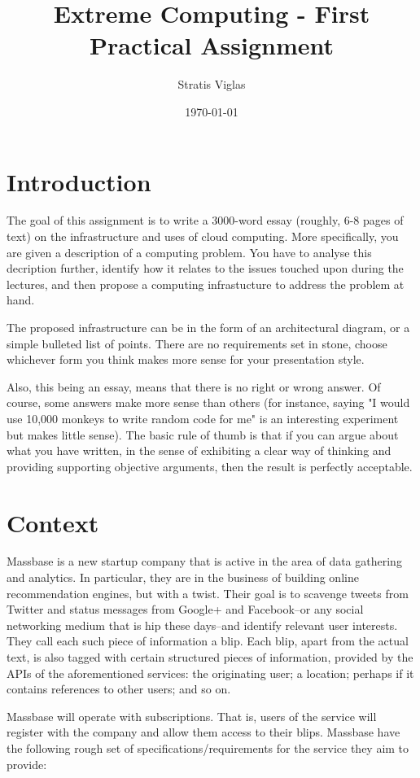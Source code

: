 \documentclass[12pt,twoside,a4paper]{article}
\title{Extreme Computing - First Practical Assignment}
\author{Stratis Viglas}
\date{\today}
\begin{document}
\maketitle
\section{Introduction}
The goal of this assignment is to write a 3000-word essay (roughly, 6-8 pages of text) on the infrastructure and uses of cloud computing. More specifically, you are given a description of a computing problem. You have to analyse this decription further, identify how it relates to the issues touched upon during the lectures, and then propose a computing infrastucture to address the problem at hand.

The proposed infrastructure can be in the form of an architectural diagram, or a simple bulleted list of points. There are no requirements set in stone, choose whichever form you think makes more sense for your presentation style.

Also, this being an essay, means that there is no right or wrong answer. Of course, some answers make more sense than others (for instance, saying "I would use 10,000 monkeys to write random code for me" is an interesting experiment but makes little sense). The basic rule of thumb is that if you can argue about what you have written, in the sense of exhibiting a clear way of thinking and providing supporting objective arguments, then the result is perfectly acceptable.
\section{Context}

Massbase is a new startup company that is active in the area of data gathering and analytics. In particular, they are in the business of building online recommendation engines, but with a twist. Their goal is to scavenge tweets from Twitter and status messages from Google+ and Facebook--or any social networking medium that is hip these days--and identify relevant user interests. They call each such piece of information a blip. Each blip, apart from the actual text, is also tagged with certain structured pieces of information, provided by the APIs of the aforementioned services: the originating user; a location; perhaps if it contains references to other users; and so on.

Massbase will operate with subscriptions. That is, users of the service will register with the company and allow them access to their blips. Massbase have the following rough set of specifications/requirements for the service they aim to provide:
\end{document}
